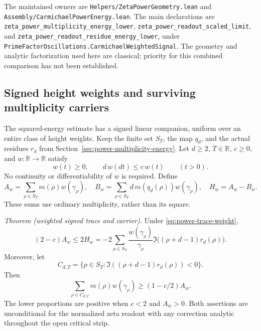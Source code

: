The maintained owners are
\texttt{Helpers/ZetaPowerGeometry.lean} and
\texttt{Assembly/CarmichaelPowerEnergy.lean}.
The main declarations are
\texttt{zeta\_power\_multiplicity\_energy\_lower},
\texttt{zeta\_power\_readout\_scaled\_limit}, and
\texttt{zeta\_power\_readout\_residue\_energy\_lower}, under
\texttt{PrimeFactorOscillations.CarmichaelWeightedSignal}.
The geometry and analytic factorization used here are classical;
priority for this combined comparison has not been established.

\subsection{Signed height weights and surviving multiplicity carriers}
\label{sec:power-weighted-trace}

The squared-energy estimate has a signed linear companion, uniform over
an entire class of height weights. Keep the finite set \(S_T\), the map
\(q_d\), and the actual residues \(r_d\) from
Section~\ref{sec:power-multiplicity-energy}. Let \(d\ge2\), \(T\in\mathbb R\),
\(c\ge0\), and \(w:\mathbb R\to\mathbb R\) satisfy
\begin{equation}\label{eq:power-trace-weight}
 w(t)\ge0,\qquad d\,w(dt)\le c\,w(t)\qquad(t>0).
\end{equation}
No continuity or differentiability of \(w\) is required. Define
\[
 A_w=\sum_{\rho\in S_T}m(\rho)w(\gamma_\rho),\quad
 B_w=\sum_{\rho\in S_T}d\,m(q_d(\rho))w(\gamma_\rho),\quad
 H_w=A_w-B_w.
\]
These sums use ordinary multiplicity, rather than its square.

\emph{Theorem (weighted signed trace and carrier).}
Under \eqref{eq:power-trace-weight},
\begin{equation}\label{eq:power-weighted-trace}
 (2-c)A_w\le2H_w
 =-2\sum_{\rho\in S_T}
       \frac{w(\gamma_\rho)}{\gamma_\rho}
       \Im\bigl((\rho+d-1)r_d(\rho)\bigr).
\end{equation}
Moreover, let
\[
 C_{d,T}=\{\rho\in S_T:
              \Im((\rho+d-1)r_d(\rho))<0\}.
\]
Then
\begin{equation}\label{eq:power-weighted-carrier}
 \sum_{\rho\in C_{d,T}}m(\rho)w(\gamma_\rho)
 \ge (1-c/2)A_w.
\end{equation}
The lower proportions are positive when \(c<2\) and \(A_w>0\).
Both assertions are unconditional for the normalized zeta readout
with any correction analytic throughout the open critical strip.

